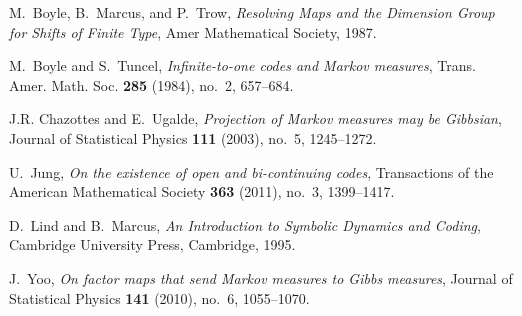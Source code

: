 \documentclass[a4paper]{amsart}
\theoremstyle{definition}
\numberwithin{equation}{section}
\numberwithin{figure}{section}
\theoremstyle{definition}
\theoremstyle{remark}
\begin{document}

\providecommand{\bysame}{\leavevmode\hbox to3em{\hrulefill}\thinspace}
\providecommand{\MR}{\relax\ifhmode\unskip\space\fi MR }
\providecommand{\MRhref}[2]{  \href{http://www.ams.org/mathscinet-getitem?mr=#1}{#2}
}
\providecommand{\href}[2]{#2}
\begin{thebibliography}{1}

M.~Boyle, B.~Marcus, and P.~Trow, \emph{{Resolving Maps and the Dimension Group
  for Shifts of Finite Type}}, Amer Mathematical Society, 1987.

M.~Boyle and S.~Tuncel, \emph{Infinite-to-one codes and {M}arkov measures},
  Trans. Amer. Math. Soc. \textbf{285} (1984), no.~2, 657--684.

J.R. Chazottes and E.~Ugalde, \emph{{Projection of Markov measures may be
  Gibbsian}}, Journal of Statistical Physics \textbf{111} (2003), no.~5,
  1245--1272.

U.~Jung, \emph{{On the existence of open and bi-continuing codes}},
  Transactions of the American Mathematical Society \textbf{363} (2011), no.~3,
  1399--1417.

D.~Lind and B.~Marcus, \emph{{An Introduction to Symbolic Dynamics and
  Coding}}, Cambridge University Press, Cambridge, 1995.

J.~Yoo, \emph{On factor maps that send {M}arkov measures to {G}ibbs measures},
  Journal of Statistical Physics \textbf{141} (2010), no.~6, 1055--1070.

\end{thebibliography}
\end{document}
